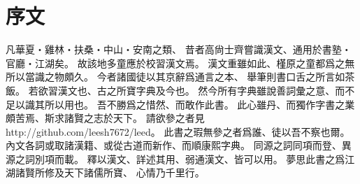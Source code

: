 \chapter*{序文}
凡華夏・雞林・扶桑・中山・安南之類、
昔者高尙士齊嘗識漢文、通用於書塾・官廳・江湖矣。
故該地多童應於校習漢文焉。
漢文重雖如此、槿原之童都爲之無所以當識之物頗久。
今者諸國徒以其京辭爲通言之本、
舉筆則書口舌之所言如茶飯。
若欲習漢文也、古之所寶字典及今也。
然今所有字典雖說善詞彙之意、而不足以識其所以用也。
吾不勝爲之惜然、而敢作此書。
此心雖丹、而獨作字書之業頗苦焉、斯求諸賢之志於天下。
請欲參之者見 http://github.com/leesh7672/leed。
此書之瑕無參之者爲誰、徒以吾不察也爾。
內文各詞或取諸漢籍、或從古道而新作、而順康熙字典。
同源之詞同項而登、異源之詞別項而載。
釋以漢文、詳述其用、弱通漢文、皆可以用。
夢思此書之爲江湖諸賢所修及天下諸儒所寶、
心情乃千里行。
